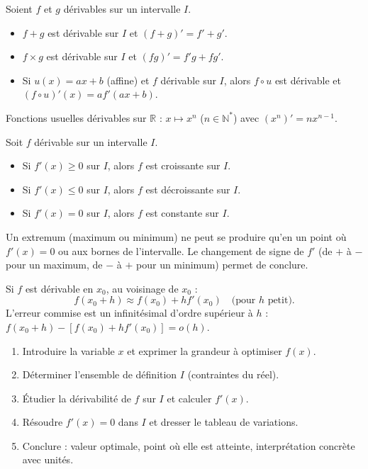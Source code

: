 \documentclass[11pt]{article}
\begin{document}
\begin{propriete}
Soient $f$ et $g$ dérivables sur un intervalle $I$.
\begin{itemize}
    \item $f+g$ est dérivable sur $I$ et $(f+g)' = f' + g'$.
    \item $f \times g$ est dérivable sur $I$ et $(fg)' = f'g + fg'$.
    \item Si $u(x) = ax+b$ (affine) et $f$ dérivable sur $I$, alors $f \circ u$ est dérivable et $(f \circ u)'(x) = a f'(ax+b)$.
\end{itemize}
Fonctions usuelles dérivables sur $\mathbb{R}$ : $x \mapsto x^n$ ($n \in \mathbb{N}^*$) avec $(x^n)' = n x^{n-1}$.
\end{propriete}

\begin{propriete}
Soit $f$ dérivable sur un intervalle $I$.
\begin{itemize}
    \item Si $f'(x) \ge 0$ sur $I$, alors $f$ est croissante sur $I$.
    \item Si $f'(x) \le 0$ sur $I$, alors $f$ est décroissante sur $I$.
    \item Si $f'(x) = 0$ sur $I$, alors $f$ est constante sur $I$.
\end{itemize}
Un extremum (maximum ou minimum) ne peut se produire qu'en un point où $f'(x)=0$ ou aux bornes de l'intervalle. Le changement de signe de $f'$ (de $+$ à $-$ pour un maximum, de $-$ à $+$ pour un minimum) permet de conclure.
\end{propriete}

\begin{propriete}
Si $f$ est dérivable en $x_0$, au voisinage de $x_0$ :
\[ f(x_0 + h) \approx f(x_0) + h f'(x_0) \quad \text{(pour $h$ petit)}. \]
L'erreur commise est un infinitésimal d'ordre supérieur à $h$ : $f(x_0+h) - [f(x_0) + h f'(x_0)] = o(h)$.
\end{propriete}

\begin{methode}
\begin{enumerate}
    \item Introduire la variable $x$ et exprimer la grandeur à optimiser $f(x)$.
    \item Déterminer l'ensemble de définition $I$ (contraintes du réel).
    \item Étudier la dérivabilité de $f$ sur $I$ et calculer $f'(x)$.
    \item Résoudre $f'(x)=0$ dans $I$ et dresser le tableau de variations.
    \item Conclure : valeur optimale, point où elle est atteinte, interprétation concrète avec unités.
\end{enumerate}
\end{methode}
\end{document}
